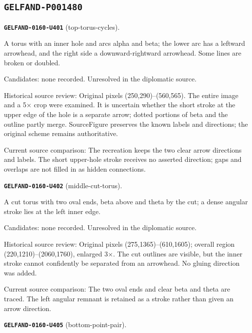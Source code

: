 \subsection*{\texttt{GELFAND-P001480}}
\par\noindent\leavevmode{}\label{GELFAND-0160-U401}\label{GELFAND-P001480:top-torus-cycles}\textbf{\texttt{GELFAND-0160-U401}} (top-torus-cycles).\nopagebreak[4]\par
A torus with an inner hole and arcs alpha and beta; the lower arc has a leftward arrowhead, and the right side a downward-rightward arrowhead. Some lines are broken or doubled.\par
Candidates: none recorded. Unresolved in the diplomatic source.\par
Historical source review: Original pixels (250,290)–(560,565). The entire image and a 5× crop were examined. It is uncertain whether the short stroke at the upper edge of the hole is a separate arrow; dotted portions of beta and the outline partly merge. SourceFigure preserves the known labels and directions; the original scheme remains authoritative.\par
Current source comparison: The recreation keeps the two clear arrow directions and labels. The short upper-hole stroke receives no asserted direction; gaps and overlaps are not filled in as hidden connections.\par\medskip
\par\noindent\leavevmode{}\label{GELFAND-0160-U402}\label{GELFAND-P001480:middle-cut-torus}\textbf{\texttt{GELFAND-0160-U402}} (middle-cut-torus).\nopagebreak[4]\par
A cut torus with two oval ends, beta above and theta by the cut; a dense angular stroke lies at the left inner edge.\par
Candidates: none recorded. Unresolved in the diplomatic source.\par
Historical source review: Original pixels (275,1365)–(610,1605); overall region (220,1210)–(2060,1760), enlarged 3×. The cut outlines are visible, but the inner stroke cannot confidently be separated from an arrowhead. No gluing direction was added.\par
Current source comparison: The two oval ends and clear beta and theta are traced. The left angular remnant is retained as a stroke rather than given an arrow direction.\par\medskip
\par\noindent\leavevmode{}\label{GELFAND-0160-U405}\label{GELFAND-P001480:bottom-point-pair}\textbf{\texttt{GELFAND-0160-U405}} (bottom-point-pair).\nopagebreak[4]\par
